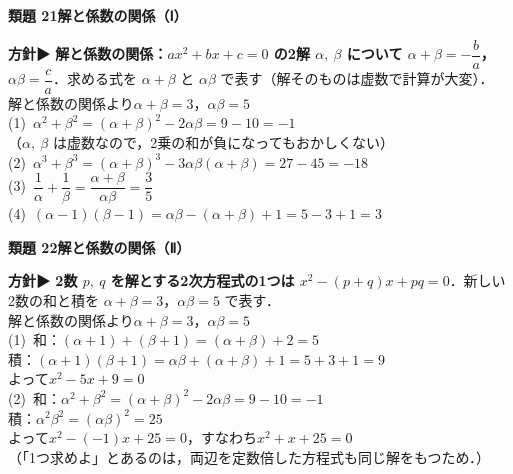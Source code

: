 \documentclass[a4paper,11pt]{ltjsarticle}
\newcommand{\ans}[2]{\Needspace{5\baselineskip}\vspace{6pt}%
  {\sffamily\bfseries 類題 #1\quad #2}\par}
\newcommand{\point}[1]{\textsf{\bfseries ▶ #1}}
\begin{document}
\ans{21}{解と係数の関係（Ⅰ）}
\begin{kai}
\textbf{方針}\quad \point{解と係数の関係：$ax^2+bx+c=0$ の2解 $\alpha,\ \beta$ について $\alpha+\beta=-\dfrac ba$，$\alpha\beta=\dfrac ca$}．求める式を $\alpha+\beta$ と $\alpha\beta$ で表す（解そのものは虚数で計算が大変）．\\[2pt]
解と係数の関係より\quad $\alpha+\beta=3$，\quad $\alpha\beta=5$\\[2pt]
(1)\ $\alpha^2+\beta^2=(\alpha+\beta)^2-2\alpha\beta=9-10=-1$\\
\hspace*{1.5em}（$\alpha,\ \beta$ は虚数なので，2乗の和が負になってもおかしくない）\\[2pt]
(2)\ $\alpha^3+\beta^3=(\alpha+\beta)^3-3\alpha\beta(\alpha+\beta)=27-45=-18$\\[2pt]
(3)\ $\dfrac1\alpha+\dfrac1\beta=\dfrac{\alpha+\beta}{\alpha\beta}=\dfrac35$\\[2pt]
(4)\ $(\alpha-1)(\beta-1)=\alpha\beta-(\alpha+\beta)+1=5-3+1=3$
\end{kai}

\ans{22}{解と係数の関係（Ⅱ）}
\begin{kai}
\textbf{方針}\quad \point{2数 $p,\ q$ を解とする2次方程式の1つは $x^2-(p+q)x+pq=0$}．新しい2数の和と積を $\alpha+\beta=3$，$\alpha\beta=5$ で表す．\\[2pt]
解と係数の関係より\quad $\alpha+\beta=3$，\quad $\alpha\beta=5$\\[2pt]
(1)\ 和：$(\alpha+1)+(\beta+1)=(\alpha+\beta)+2=5$\\
\hspace*{1.5em}積：$(\alpha+1)(\beta+1)=\alpha\beta+(\alpha+\beta)+1=5+3+1=9$\\
\hspace*{1.5em}よって\quad $x^2-5x+9=0$\\[2pt]
(2)\ 和：$\alpha^2+\beta^2=(\alpha+\beta)^2-2\alpha\beta=9-10=-1$\\
\hspace*{1.5em}積：$\alpha^2\beta^2=(\alpha\beta)^2=25$\\
\hspace*{1.5em}よって\quad $x^2-(-1)x+25=0$，すなわち\quad $x^2+x+25=0$\\
\hspace*{1.5em}（「1つ求めよ」とあるのは，両辺を定数倍した方程式も同じ解をもつため．）
\end{kai}
\end{document}
